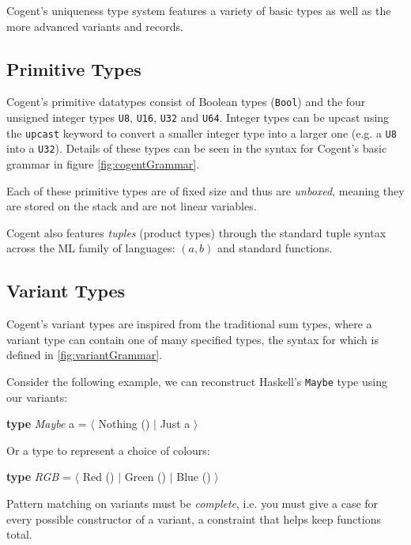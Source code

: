 Cogent's uniqueness type system features a variety of basic types as well as the more advanced variants
and records.

\subsection{Primitive Types}

Cogent's primitive datatypes consist of Boolean types (\texttt{Bool}) and the four unsigned integer types \texttt{U8}, 
\texttt{U16}, \texttt{U32} and \texttt{U64}. Integer types can be upcast using the \texttt{\textsf{upcast}}
keyword to convert a smaller integer type into a larger one (e.g. a \texttt{U8} into a \texttt{U32}).
Details of these types can be seen in the syntax for Cogent's basic grammar in figure \ref{fig:cogentGrammar}.

Each of these primitive types are of fixed size and thus are \emph{unboxed}, meaning they are stored on the
stack and are not linear variables.

Cogent also features \emph{tuples} (product types) through the standard tuple syntax across the ML
family of languages: $(a,b)$ and standard functions.

\subsection{Variant Types}

Cogent's variant types are inspired from the traditional sum types, where a variant type can contain
one of many specified types, the syntax for which is defined in \autoref{fig:variantGrammar}.

Consider the following example, we can reconstruct Haskell's \texttt{Maybe} type using our variants:

\begin{center}
    \textbf{type} \textit{Maybe} a = $\langle$ Nothing () $\vert$ Just a $\rangle$
\end{center}

Or a type to represent a choice of colours:

\begin{center}
    \textbf{type} \textit{RGB} = $\langle$ Red () $\vert$ Green () $\vert$ Blue () $\rangle$
\end{center}

Pattern matching on variants must be \textit{complete}, i.e. you must give a case for every possible constructor
of a variant, a constraint that helps keep functions total.

